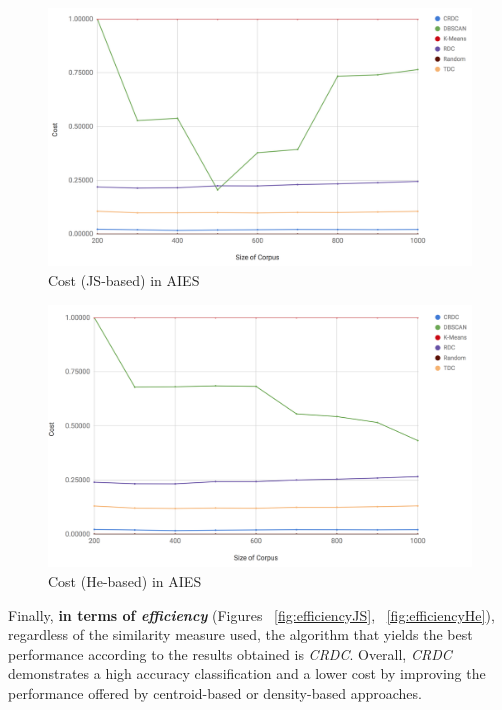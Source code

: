 \begin{figure}
  \includegraphics[scale=0.27]{costJS.png}
  \caption{Cost (JS-based) in AIES}
  \label{fig:costJS}
\end{figure}
\begin{figure}
  \includegraphics[scale=0.27]{costHe.png}
  \caption{Cost (He-based) in AIES}
  \label{fig:costHe}
\end{figure}

Finally, \textbf{in terms of \textit{efficiency}} (Figures ~\ref{fig:efficiencyJS}, ~\ref{fig:efficiencyHe}), regardless of the similarity measure used, the algorithm that yields the best performance according to the results obtained is \textit{CRDC}. Overall, \textit{CRDC} demonstrates a high accuracy classification and a lower cost by improving the performance offered by centroid-based or density-based approaches.

